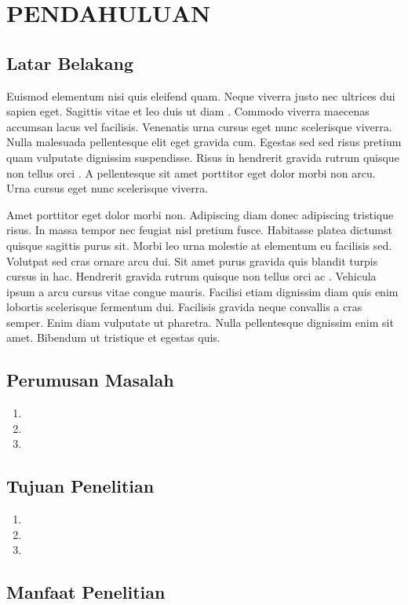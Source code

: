 \chapter{PENDAHULUAN}

\section{Latar Belakang}
Euismod elementum nisi quis eleifend quam. Neque viverra justo nec ultrices dui sapien eget. Sagittis vitae et leo duis ut diam \cite{IEApvps2020,irena2019}. Commodo viverra maecenas accumsan lacus vel facilisis. Venenatis urna cursus eget nunc scelerisque viverra. Nulla malesuada pellentesque elit eget gravida cum. Egestas sed sed risus pretium quam vulputate dignissim suspendisse. Risus in hendrerit gravida rutrum quisque non tellus orci \cite{Wang2004,Gozel2009}. A pellentesque sit amet porttitor eget dolor morbi non arcu. Urna cursus eget nunc scelerisque viverra.

Amet porttitor eget dolor morbi non. Adipiscing diam donec adipiscing tristique risus. In massa tempor nec feugiat nisl pretium fusce. Habitasse platea dictumst quisque sagittis purus sit. Morbi leo urna molestie at elementum eu facilisis sed. Volutpat sed cras ornare arcu dui. Sit amet purus gravida quis blandit turpis cursus in hac. Hendrerit gravida rutrum quisque non tellus orci ac \cite{Reno2016,Andresen2016}. Vehicula ipsum a arcu cursus vitae congue mauris. Facilisi etiam dignissim diam quis enim lobortis scelerisque fermentum dui. Facilisis gravida neque convallis a cras semper. Enim diam vulputate ut pharetra. Nulla pellentesque dignissim enim sit amet. Bibendum ut tristique et egestas quis.

\lipsum[45-47]

\section{Perumusan Masalah}
\lipsum[10]
\begin{enumerate}
    \item \lipsum[19]
    \item \lipsum[20]
    \item \lipsum[21]
\end{enumerate}

\section{Tujuan Penelitian}
\lipsum[23]
\begin{enumerate}
    \item \lipsum[25]
    \item \lipsum[27]
    \item \lipsum[29]
\end{enumerate}

\section{Manfaat Penelitian}
\lipsum[77]
